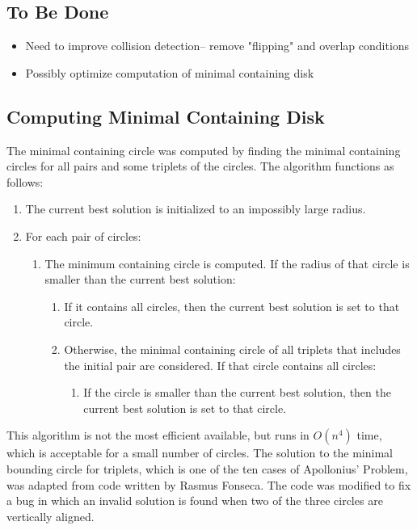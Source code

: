 \documentclass[a4paper]{article}
\begin{document}
 \subsection{To Be Done}
  \begin{multicols}{2}
 \begin{itemize}
\item Need to improve collision detection-- remove "flipping" and overlap conditions
\item Possibly optimize computation of minimal containing disk
\end{itemize}
\end{multicols}
 
\subsection{Computing Minimal Containing Disk}
The minimal containing circle was computed by finding the minimal containing circles for all pairs and some triplets of the circles.
The algorithm functions as follows:
\begin{enumerate}
	\item The current best solution is initialized to an impossibly large radius.
	\item For each pair of circles:
	\begin{enumerate}
		\item The minimum containing circle is computed.  If the radius of that circle is smaller than the current best solution:
		\begin{enumerate}
			\item If it contains all circles, then the current best solution is set to that circle.
			\item Otherwise, the minimal containing circle of all triplets that includes the initial pair are considered.  If that circle contains all circles:
			\begin{enumerate}
				\item If the circle is smaller than the current best solution, then the current best solution is set to that circle.
			\end{enumerate}
		\end{enumerate}
	\end{enumerate}
\end{enumerate}

This algorithm is not the most efficient available, but runs in $O(n^4)$ time, which is acceptable for a small number of circles.
The solution to the minimal bounding circle for triplets, which is one of the ten cases of Apollonius' Problem, was adapted from code written by Rasmus Fonseca.
The code was modified to fix a bug in which an invalid solution is found when two of the three circles are vertically aligned.
\end{document}
